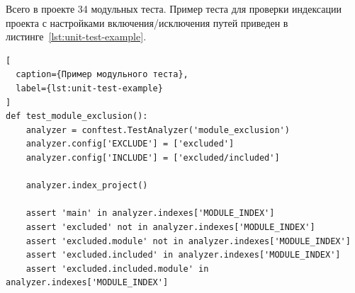 Всего в проекте 34 модульных теста. Пример теста для проверки
индексации проекта с настройками включения/исключения путей приведен в
листинге~\ref{lst:unit-test-example}.

\begin{lstlisting}[
  caption={Пример модульного теста},
  label={lst:unit-test-example}
]
def test_module_exclusion():
    analyzer = conftest.TestAnalyzer('module_exclusion')
    analyzer.config['EXCLUDE'] = ['excluded']
    analyzer.config['INCLUDE'] = ['excluded/included']

    analyzer.index_project()

    assert 'main' in analyzer.indexes['MODULE_INDEX']
    assert 'excluded' not in analyzer.indexes['MODULE_INDEX']
    assert 'excluded.module' not in analyzer.indexes['MODULE_INDEX']
    assert 'excluded.included' in analyzer.indexes['MODULE_INDEX']
    assert 'excluded.included.module' in analyzer.indexes['MODULE_INDEX']

\end{lstlisting}
